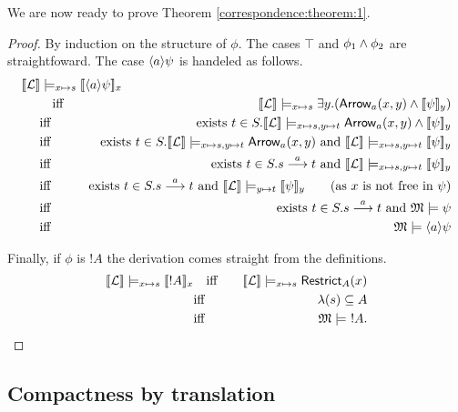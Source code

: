 \NI We are now ready to prove Theorem \ref{correspondence:theorem:1}.
\begin{proof}
By induction on the structure of $\phi$. The cases $\top$ and $\phi_1
\land \phi_2$ are straightfoward.  The case $\langle a \rangle \psi$ is handeled
as follows.
\begin{eqnarray*}
  \lefteqn{
  \SEMB{\LLL} \models_{x \mapsto s} \SEMB{\MAY{a}\psi}_x}\hspace{5mm} 
     \\
     &\quad \text{iff}\quad &
  \SEMB{\LLL} \models_{x \mapsto s} \exists y.(\ARROW{a}{x}{y} \AND \SEMB{\psi}_y) 
     \\
     &\text{iff}&
  \text{exists}\ t \in S. \SEMB{\LLL} \models_{x \mapsto s, y \mapsto t} \ARROW{a}{x}{y} \AND \SEMB{\psi}_y
     \\
     &\text{iff}&
  \text{exists}\ t \in S. \SEMB{\LLL} \models_{x \mapsto s, y \mapsto t} \ARROW{a}{x}{y} \ \text{and}\ \SEMB{\LLL} \models_{x \mapsto s, y \mapsto t}  \SEMB{\psi}_y
     \\
     &\text{iff}&
  \text{exists}\ t \in S. s \TRANS{a} t \ \text{and}\ \SEMB{\LLL} \models_{x \mapsto s, y \mapsto t}  \SEMB{\psi}_y
     \\
     &\text{iff}&
  \text{exists}\ t \in S. s \TRANS{a} t \ \text{and}\ \SEMB{\LLL} \models_{y \mapsto t}  \SEMB{\psi}_y \qquad (\text{as $x$ is not free in $\psi$})
     \\
     &\text{iff}&
  \text{exists}\ t \in S. s \TRANS{a} t \ \text{and}\ \MMM \models \psi
     \\
     &\text{iff}&
  \MMM \models \MAY{a}\psi  
\end{eqnarray*}

\NI Finally, if $\phi$ is $!A$ the derivation comes straight from the
definitions.
\begin{eqnarray*}
  \lbrack\!\lbrack \mathcal{L} \rbrack\!\rbrack \models_{x \mapsto s} \lbrack\!\lbrack !A \rbrack\!\rbrack_x
    &\quad \text{iff}\quad &
  \lbrack\!\lbrack \mathcal{L} \rbrack\!\rbrack \models_{x \mapsto s} \mathsf{Restrict}_{A}(x)
     \\
     &\text{iff}&
  \lambda(s) \subseteq A
     \\
     &\text{iff}&
  \frak{M} \models\ !A.
\end{eqnarray*}
\end{proof}

\subsection{Compactness by translation}\label{compactnessProof}

